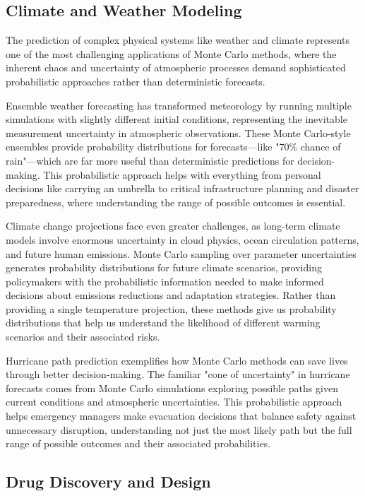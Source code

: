\subsection{Climate and Weather Modeling}

The prediction of complex physical systems like weather and climate represents one of the most challenging applications of Monte Carlo methods, where the inherent chaos and uncertainty of atmospheric processes demand sophisticated probabilistic approaches rather than deterministic forecasts.

Ensemble weather forecasting has transformed meteorology by running multiple simulations with slightly different initial conditions, representing the inevitable measurement uncertainty in atmospheric observations. These Monte Carlo-style ensembles provide probability distributions for forecasts—like "70\% chance of rain"—which are far more useful than deterministic predictions for decision-making. This probabilistic approach helps with everything from personal decisions like carrying an umbrella to critical infrastructure planning and disaster preparedness, where understanding the range of possible outcomes is essential.

Climate change projections face even greater challenges, as long-term climate models involve enormous uncertainty in cloud physics, ocean circulation patterns, and future human emissions. Monte Carlo sampling over parameter uncertainties generates probability distributions for future climate scenarios, providing policymakers with the probabilistic information needed to make informed decisions about emissions reductions and adaptation strategies. Rather than providing a single temperature projection, these methods give us probability distributions that help us understand the likelihood of different warming scenarios and their associated risks.

Hurricane path prediction exemplifies how Monte Carlo methods can save lives through better decision-making. The familiar "cone of uncertainty" in hurricane forecasts comes from Monte Carlo simulations exploring possible paths given current conditions and atmospheric uncertainties. This probabilistic approach helps emergency managers make evacuation decisions that balance safety against unnecessary disruption, understanding not just the most likely path but the full range of possible outcomes and their associated probabilities.

\subsection{Drug Discovery and Design}

